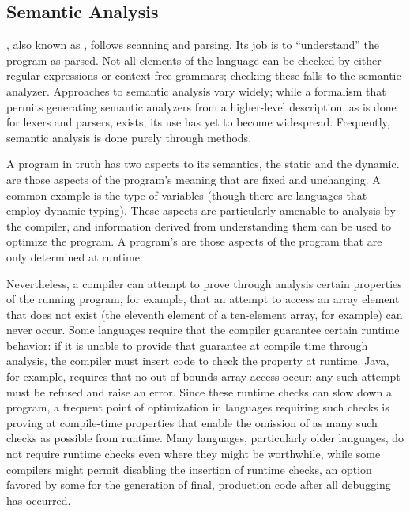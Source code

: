 \subsection{Semantic Analysis}
, also known as , follows scanning and parsing. Its job is to ``understand'' the program as parsed. Not all elements of the language can be checked by either regular expressions or context-free grammars; checking these falls to the semantic analyzer. Approaches to semantic analysis vary widely; while a formalism that permits generating semantic analyzers from a higher-level description, as is done for lexers and parsers, exists, its use has yet to become widespread. Frequently, semantic analysis is done purely through  methods.

A program in truth has two aspects to its semantics, the static and the dynamic.  are those aspects of the program's meaning that are fixed and unchanging. A common example is the type of variables (though there are languages that employ dynamic typing). These aspects are particularly amenable to analysis by the compiler, and information derived from understanding them can be used to optimize the program. A program's  are those aspects of the program that are only determined at runtime.

Nevertheless, a compiler can attempt to prove through analysis certain properties of the running program, for example, that an attempt to access an array element that does not exist (the eleventh element of a ten-element array, for example) can never occur. Some languages require that the compiler guarantee certain runtime behavior: if it is unable to provide that guarantee at compile time through analysis, the compiler must insert code to check the property at runtime. Java, for example, requires that no out-of-bounds array access occur: any such attempt must be refused and raise an error. Since these runtime checks can slow down a program, a frequent point of optimization in languages requiring such checks is proving at compile-time properties that enable the omission of as many such checks as possible from runtime. Many languages, particularly older languages, do not require runtime checks even where they might be worthwhile, while some compilers might permit disabling the insertion of runtime checks, an option favored by some for the generation of final, production code after all debugging has occurred.

